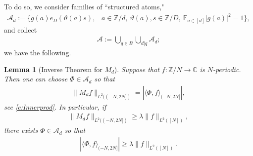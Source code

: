 \documentclass[12pt]{amsart}
\numberwithin{equation}{section}
\newtheorem{lemma}[theorem]{Lemma}
\theoremstyle{definition}
\begin{document}
To do so, we consider families of ``structured atoms," 
\begin{align}
    \mathcal{A}_d := \{  g(a) e_D(\vartheta(a) s), \; \; \; a \in \mathbb{Z}/d, \ \vartheta(a), s \in \mathbb{Z}/D, \ \mathbb{E}_{a \in [d]} |g(a)|^2 = 1 \},
\end{align}
and collect
\begin{align}
\mathcal{A} := \bigcup_{q \in B} \bigcup_{d | q} \mathcal{A}_d;
\end{align}
we have the following.
\begin{lemma}[Inverse Theorem for $M_d$]\label{l:invMd}
    Suppose that $f : \mathbb{Z}/N \to \mathbb{C}$ is $N$-periodic. Then one can choose $\Phi \in \mathcal{A}_d$ so that
    \begin{align}
        \| M_d f \|_{L^2((-N,2N])} = |\langle \Phi, f \rangle_{(-N,2N]}|,
    \end{align}
see \eqref{e:Innerprod}. In particular, if
    \begin{align}
        \| M_d f \|_{L^2((-N,2N])} \geq \lambda \| f \|_{L^2([N])},
    \end{align}
    there exists $\Phi \in \mathcal{A}_d$ so that
    \begin{align}
        |\langle \Phi, f \rangle_{(-N,2N]}| \geq \lambda \|f \|_{L^2([N])}.
    \end{align}
\end{lemma}
\end{document}
